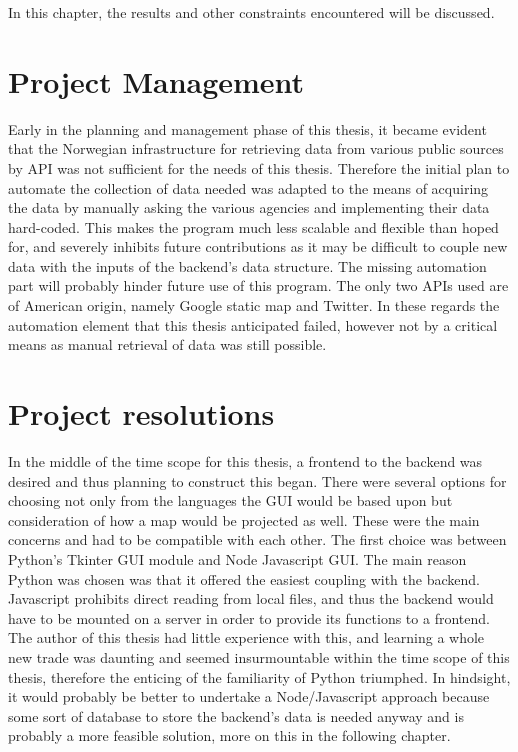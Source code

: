 
In this chapter, the results and other constraints encountered will be discussed.

\section{Project Management}

Early in the planning and management phase of this thesis, it became evident that the Norwegian infrastructure for retrieving data from various public sources by API was not sufficient for the needs of this thesis. Therefore the initial plan to automate the collection of data needed was adapted to the means of acquiring the data by manually asking the various agencies and implementing their data hard-coded. This makes the program much less scalable and flexible than hoped for, and severely inhibits future contributions as it may be difficult to couple new data with the inputs of the backend's data structure. The missing automation part will probably hinder future use of this program. The only two APIs used are of American origin, namely Google static map and Twitter. In these regards the automation element that this thesis anticipated failed, however not by a critical means as manual retrieval of data was still possible.






\section{Project resolutions}
In the middle of the time scope for this thesis, a frontend to the backend was desired and thus planning to construct this began. There were several options for choosing not only from the languages the GUI would be based upon but consideration of how a map would be projected as well. These were the main concerns and had to be compatible with each other. The first choice was between Python's Tkinter GUI module and Node Javascript GUI. The main reason Python was chosen was that it offered the easiest coupling with the backend. Javascript prohibits direct reading from local files, and thus the backend would have to be mounted on a server in order to provide its functions to a frontend. The author of this thesis had little experience with this, and learning a whole new trade was daunting and seemed insurmountable within the time scope of this thesis, therefore the enticing of the familiarity of Python triumphed. In hindsight, it would probably be better to undertake a Node/Javascript approach because some sort of database to store the backend's data is needed anyway and is probably a more feasible solution, more on this in the following chapter.

